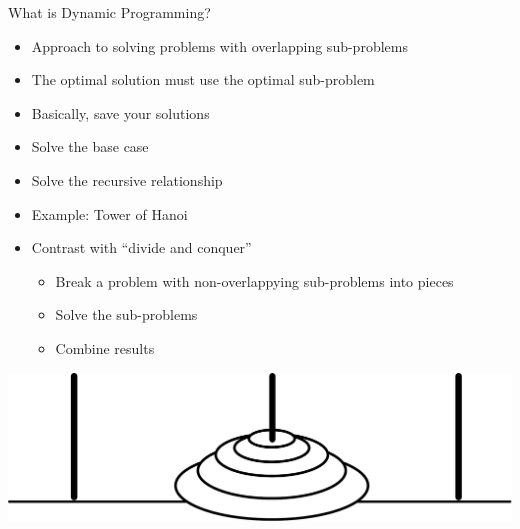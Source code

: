\documentclass[aspectratio=169]{beamer}
\begin{document}
\begin{frame}{What is Dynamic Programming?}

\begin{itemize}
\item Approach to solving problems with overlapping sub-problems
\item The optimal solution must use the optimal sub-problem
\item Basically, save your solutions 
\item Solve the base case
\item Solve the recursive relationship
\item Example: Tower of Hanoi
\item Contrast with ``divide and conquer''
	\begin{itemize}
	\item Break a problem with  non-overlappying sub-problems into pieces
	\item Solve the sub-problems
	\item Combine results
	\end{itemize}
\end{itemize}
\includegraphics[width=.5\textwidth]{lectSeq/hanoi.pdf}
\end{frame}
\end{document}
